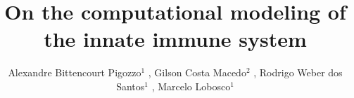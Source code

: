 \documentclass[10pt]{bmc_article}
\newenvironment{bmcformat}{\baselineskip20pt\sloppy\setboolean{publ}{false}}{\baselineskip20pt\sloppy}
\begin{document}
\begin{bmcformat}



\title{On the computational modeling of the innate immune system}
 

\author{Alexandre Bittencourt Pigozzo\correspondingauthor$^1$%
,
         Gilson Costa Macedo$^2$%
 ,
         Rodrigo Weber dos Santos$^1$%
  ,
         Marcelo Lobosco$^1$%
      }
      




\address{%
    \iid(1)Graduate Program in Computational Modeling, UFJF, Rua Jos\'{e} Louren\c{c}o Kelmer, s/n - Campus Universit\'{a}rio,
        Bairro S\~{a}o Pedro, CEP: 36036-900, Juiz de Fora, MG, Brazil\\
    \iid(2)Graduate Program in Biological Sciences, UFJF, Rua Jos\'{e} Louren\c{c}o Kelmer, s/n - Campus Universit\'{a}rio,
        Bairro S\~{a}o Pedro, CEP: 36036-900, Juiz de Fora, MG, Brazil
}%


\end{bmcformat}
\end{document}
